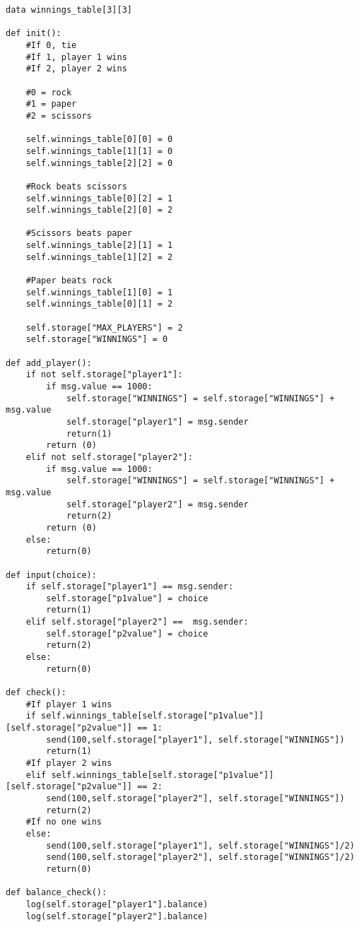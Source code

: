 \documentclass[10pt,twocolumn,letterpaper]{article}
\begin{document}
\begin{mdframed}
\begin{verbatim}
data winnings_table[3][3]

def init():
	#If 0, tie
	#If 1, player 1 wins
	#If 2, player 2 wins

	#0 = rock
	#1 = paper
	#2 = scissors

	self.winnings_table[0][0] = 0
	self.winnings_table[1][1] = 0
	self.winnings_table[2][2] = 0

	#Rock beats scissors
	self.winnings_table[0][2] = 1
	self.winnings_table[2][0] = 2

	#Scissors beats paper
	self.winnings_table[2][1] = 1
	self.winnings_table[1][2] = 2

	#Paper beats rock
	self.winnings_table[1][0] = 1
	self.winnings_table[0][1] = 2

	self.storage["MAX_PLAYERS"] = 2
	self.storage["WINNINGS"] = 0

def add_player():
	if not self.storage["player1"]:
		if msg.value == 1000:
			self.storage["WINNINGS"] = self.storage["WINNINGS"] + msg.value
			self.storage["player1"] = msg.sender
			return(1)
		return (0)
	elif not self.storage["player2"]:
		if msg.value == 1000:
			self.storage["WINNINGS"] = self.storage["WINNINGS"] + msg.value
			self.storage["player2"] = msg.sender
			return(2)
		return (0)
	else:
		return(0)

def input(choice):
	if self.storage["player1"] == msg.sender:
		self.storage["p1value"] = choice
		return(1)
	elif self.storage["player2"] ==  msg.sender:
		self.storage["p2value"] = choice
		return(2)
	else:
		return(0)

def check():
	#If player 1 wins
	if self.winnings_table[self.storage["p1value"]][self.storage["p2value"]] == 1:
		send(100,self.storage["player1"], self.storage["WINNINGS"])
		return(1)
	#If player 2 wins
	elif self.winnings_table[self.storage["p1value"]][self.storage["p2value"]] == 2:
		send(100,self.storage["player2"], self.storage["WINNINGS"])
		return(2)
	#If no one wins
	else:
		send(100,self.storage["player1"], self.storage["WINNINGS"]/2)
		send(100,self.storage["player2"], self.storage["WINNINGS"]/2)
		return(0)

def balance_check():
	log(self.storage["player1"].balance)
	log(self.storage["player2"].balance)
\end{verbatim}
\end{mdframed}
\end{document}
